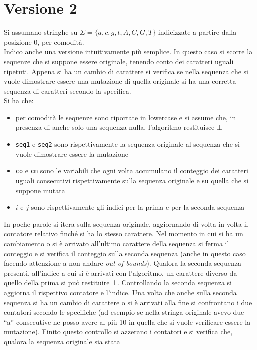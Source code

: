 \documentclass[a4paper,12pt, oneside]{book}
\begin{document}
\section{Versione 2}
Si assumano stringhe su $\Sigma=\{a,c,g,t,A,C,G,T\}$ indicizzate a partire dalla
posizione 0, per comodità.\\
Indico anche una versione intuitivamente più semplice. In questo caso si scorre
la sequenze che si suppone essere 
originale, tenendo conto dei caratteri uguali ripetuti. Appena si ha un cambio
di carattere si verifica se nella sequenza che si vuole dimostrare essere una
mutazione di quella originale si ha una corretta sequenza di caratteri secondo
la specifica.\\
Si ha che:
\begin{itemize}
  \item per comodità le sequenze sono riportate in lowercase e si assume che, in
  presenza di anche solo una sequenza nulla, l'algoritmo restituisce $\bot$
  \item \texttt{seq1} e \texttt{seq2} sono rispettivamente la sequenza originale
  al sequenza che si vuole dimostrare essere la mutazione
  \item \texttt{co} e \texttt{cm} sono le variabili che ogni volta
  accumulano il conteggio dei caratteri uguali consecutivi rispettivamente sulla
  sequenza originale e su quella che si suppone mutata
  \item $i$ e $j$ sono rispettivamente gli indici per la prima e per la seconda
  sequenza 
\end{itemize}
In poche parole si itera sulla sequenza originale, aggiornando di volta in volta
il contatore relativo finché si ha lo stesso carattere. Nel momento in cui si ha
un cambiamento o si è arrivato all'ultimo carattere della sequenza si ferma il
conteggio e si verifica il conteggio sulla seconda sequenza (anche in questo
caso facendo attenzione a non andare \textit{out of bounds}). Qualora la seconda
sequenza presenti, all'indice a cui si è arrivati con l'algoritmo, un carattere
diverso da quello della prima si può restituire $\bot$. Controllando la
seconda sequenza si aggiorna il rispettivo contatore e l'indice. Una volta che
anche sulla seconda sequenza si ha un cambio di carattere o si è arrivati alla
fine si confrontano i due contatori secondo le specifiche (ad esempio se nella
stringa originale avevo due ``a'' consecutive ne posso avere al più 10 in quella
che si vuole verificare essere la mutazione). Finito questo controllo si
azzerano i contatori e si verifica che, qualora la sequenza originale sia stata
\end{document}
